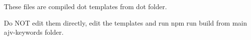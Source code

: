 These files are compiled dot templates from dot folder.

Do NOT edit them directly, edit the templates and run {\ttfamily npm run build} from main ajv-\/keywords folder. 
